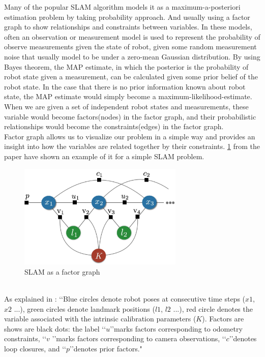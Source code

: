 \documentclass[12pt,twoside]{article}
\begin{document}
Many of the popular SLAM algorithm models it as a maximum-a-posteriori estimation problem  by taking probability approach. And usually using a factor graph to show relationships and constraints between variables. In these models, often an observation or measurement model
is used to represent the probability of observe measurements given the state of robot, given some random measurement noise that usually model to be under a zero-mean Gaussian distribution. By using Bayes theorem, the MAP estimate, in which the posterior is the probability of robot state given a measurement, can be calculated given some prior belief of the robot state. In the case that there is no prior information known about robot state, the MAP estimate would simply become a maximum-likelihood-estimate. When we are given a set of independent robot states and measurements, these variable would become factors(nodes) in the factor graph, and their probabilistic relationships would become the constraints(edges) in the factor graph.\\
Factor graph allows us to visualize our problem in a simple way and provides an insight into how the variables are related together by their constraints. \ref{fig:factorgraph} from the paper have shown an example of it for a simple SLAM problem.
\\
\begin{figure}[h]
    \centering
    \includegraphics[width=0.7\textwidth]{figures/factorgraph}
    \caption{SLAM as a factor graph\cite{cadena2016past}}
    \label{fig:factorgraph}
\end{figure}
\\
As explained in \cite{cadena2016past}: \lq\lq Blue circles denote robot poses at
consecutive time steps ($x1$, $x2$ ...), green circles denote landmark positions
($l1$, $l2$ ...), red circle denotes the variable associated with the intrinsic
calibration parameters ($K$). Factors are shows are black dots: the label \lq\lq $u$\rq\rq marks factors corresponding to odometry constraints, \lq\lq $v$ \rq\rq marks factors corresponding to camera observations, \lq\lq $c$\rq\rq denotes loop closures, and \lq\lq $p$\rq\rq denotes prior factors."\\
\end{document}
